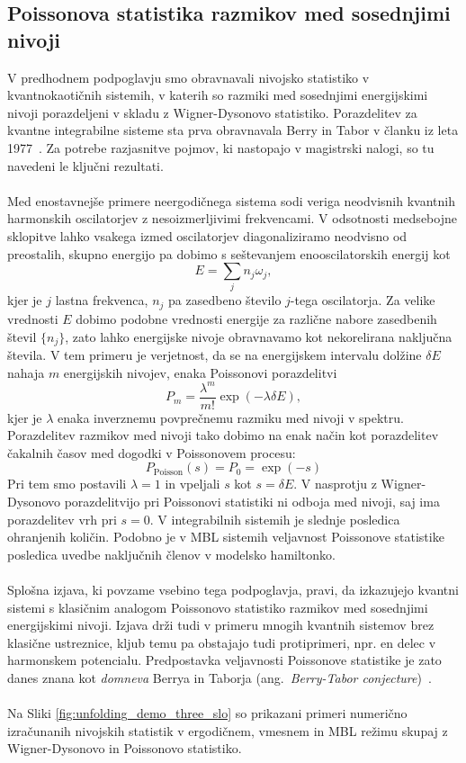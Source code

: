  \subsection{Poissonova statistika razmikov med sosednjimi nivoji}
 V predhodnem podpoglavju smo obravnavali nivojsko statistiko v kvantnokaotičnih sistemih, v katerih so razmiki med sosednjimi energijskimi nivoji porazdeljeni v skladu z Wigner-Dysonovo statistiko. Porazdelitev za kvantne integrabilne sisteme sta prva obravnavala Berry in Tabor v članku iz leta 1977~\cite{berry1977level}. Za potrebe razjasnitve pojmov, ki nastopajo v magistrski nalogi, so tu navedeni le ključni rezultati. \\\\
 Med enostavnejše primere neergodičnega sistema sodi veriga neodvisnih kvantnih harmonskih oscilatorjev z nesoizmerljivimi frekvencami. V odsotnosti medsebojne sklopitve lahko vsakega izmed oscilatorjev diagonaliziramo neodvisno od preostalih, skupno energijo pa dobimo s seštevanjem enooscilatorskih energij kot 
 $$
 E=\sum_j n_j\omega_j,
 $$ 
 kjer je $j$ lastna frekvenca, $n_j$ pa zasedbeno število $j$-tega oscilatorja. Za velike vrednosti $E$ dobimo podobne vrednosti energije za različne nabore zasedbenih števil $\{n_j\}$, zato lahko energijske nivoje obravnavamo kot nekorelirana naključna števila. V tem primeru je verjetnost, da se na energijskem intervalu dolžine $\delta E$ nahaja $m$ energijskih nivojev, enaka Poissonovi porazdelitvi 
 \begin{equation}
 P_m=\frac{\lambda^m}{m!}\exp\left(-\lambda \delta E\right),
 \end{equation}
 kjer je $\lambda$ enaka inverznemu povprečnemu razmiku med nivoji v spektru. Porazdelitev razmikov med nivoji tako dobimo na enak način kot porazdelitev čakalnih časov med dogodki v Poissonovem procesu:
 \begin{equation}\label{eq:poisson}
 P_\mathrm{Poisson}(s)=P_0=\exp\left(-s\right)
 \end{equation}
 Pri tem smo postavili $\lambda=1$ in vpeljali $s$ kot  $s=\delta E$. V nasprotju z Wigner-Dysonovo porazdelitvijo pri Poissonovi statistiki ni odboja med nivoji, saj ima porazdelitev vrh pri $s=0$. V integrabilnih sistemih je slednje posledica ohranjenih količin. Podobno je v MBL sistemih veljavnost Poissonove statistike posledica uvedbe naključnih členov v modelsko hamiltonko. \\\\
 Splošna izjava, ki povzame vsebino tega podpoglavja, pravi, da izkazujejo kvantni sistemi s klasičnim analogom Poissonovo statistiko razmikov med sosednjimi energijskimi nivoji. Izjava drži tudi v primeru mnogih kvantnih sistemov brez klasične ustreznice, kljub temu pa obstajajo tudi protiprimeri, npr. en delec v harmonskem potencialu. Predpostavka veljavnosti Poissonove statistike je zato danes znana kot \emph{domneva} Berrya in Taborja (ang.~\emph{Berry-Tabor conjecture})~\cite{berry1977level}.\\\\
 Na Sliki \ref{fig:unfolding_demo_three_slo} so prikazani primeri numerično izračunanih nivojskih statistik v ergodičnem, vmesnem in MBL režimu skupaj z Wigner-Dysonovo in Poissonovo statistiko. 

